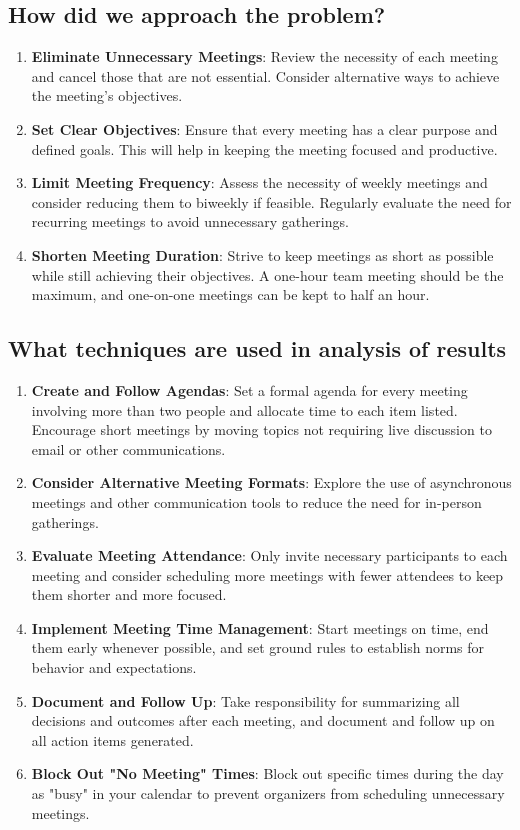 \subsection{How did we approach the problem?}
\begin{enumerate}[noitemsep]
\item {\bf Eliminate Unnecessary Meetings}: Review the necessity of each meeting and cancel those that are not essential. Consider alternative ways to achieve the meeting's objectives.
\item {\bf Set Clear Objectives}: Ensure that every meeting has a clear purpose and defined goals. This will help in keeping the meeting focused and productive.
\item {\bf Limit Meeting Frequency}: Assess the necessity of weekly meetings and consider reducing them to biweekly if feasible. Regularly evaluate the need for recurring meetings to avoid unnecessary gatherings.
\item {\bf Shorten Meeting Duration}: Strive to keep meetings as short as possible while still achieving their objectives. A one-hour team meeting should be the maximum, and one-on-one meetings can be kept to half an hour.
\end{enumerate}
\subsection{What techniques are used in analysis of results}
\begin{enumerate}[noitemsep]
\item {\bf Create and Follow Agendas}: Set a formal agenda for every meeting involving more than two people and allocate time to each item listed. Encourage short meetings by moving topics not requiring live discussion to email or other communications.
\item {\bf Consider Alternative Meeting Formats}: Explore the use of asynchronous meetings and other communication tools to reduce the need for in-person gatherings.
\item {\bf Evaluate Meeting Attendance}: Only invite necessary participants to each meeting and consider scheduling more meetings with fewer attendees to keep them shorter and more focused.
\item {\bf Implement Meeting Time Management}: Start meetings on time, end them early whenever possible, and set ground rules to establish norms for behavior and expectations.
\item {\bf Document and Follow Up}: Take responsibility for summarizing all decisions and outcomes after each meeting, and document and follow up on all action items generated.
\item {\bf Block Out "No Meeting" Times}: Block out specific times during the day as "busy" in your calendar to prevent organizers from scheduling unnecessary meetings.
\end{enumerate}
\newpage
